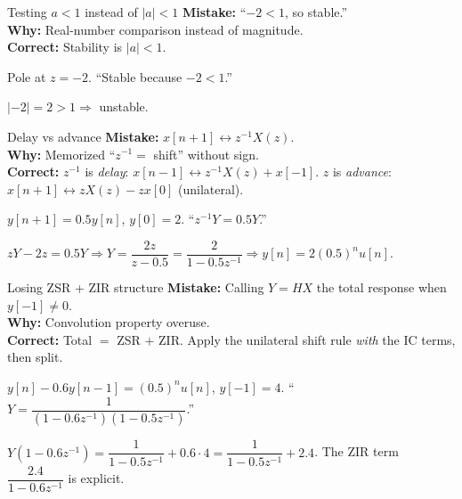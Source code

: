 \documentclass[11pt]{article}
\begin{document}
\begin{pitfallbox}{Testing $a<1$ instead of $|a|<1$}
\textbf{Mistake:} ``$-2 < 1$, so stable.''\\
\textbf{Why:} Real-number comparison instead of magnitude.\\
\textbf{Correct:} Stability is $|a|<1$.
\begin{wrongbox}
Pole at $z=-2$. ``Stable because $-2<1$.''
\end{wrongbox}
\begin{rightbox}
$|-2|=2>1 \Rightarrow$ unstable.
\end{rightbox}
\end{pitfallbox}

\begin{pitfallbox}{Delay vs advance}
\textbf{Mistake:} $x[n+1] \leftrightarrow z^{-1} X(z)$.\\
\textbf{Why:} Memorized ``$z^{-1} = $ shift'' without sign.\\
\textbf{Correct:} $z^{-1}$ is \emph{delay}: $x[n-1] \leftrightarrow z^{-1}X(z) + x[-1]$. $z$ is \emph{advance}: $x[n+1] \leftrightarrow zX(z) - z x[0]$ (unilateral).
\begin{wrongbox}
$y[n+1] = 0.5 y[n]$, $y[0]=2$. ``$z^{-1}Y = 0.5 Y$.''
\end{wrongbox}
\begin{rightbox}
$zY - 2z = 0.5 Y \Rightarrow Y = \dfrac{2z}{z-0.5} = \dfrac{2}{1-0.5z^{-1}} \Rightarrow y[n] = 2(0.5)^n u[n]$.
\end{rightbox}
\end{pitfallbox}

\begin{pitfallbox}{Losing ZSR + ZIR structure}
\textbf{Mistake:} Calling $Y = HX$ the total response when $y[-1]\ne 0$.\\
\textbf{Why:} Convolution property overuse.\\
\textbf{Correct:} Total $=$ ZSR $+$ ZIR. Apply the unilateral shift rule \emph{with} the IC terms, then split.
\begin{wrongbox}
$y[n] - 0.6 y[n-1] = (0.5)^n u[n]$, $y[-1]=4$. ``$Y = \dfrac{1}{(1-0.6z^{-1})(1-0.5z^{-1})}$.''
\end{wrongbox}
\begin{rightbox}
$Y(1-0.6z^{-1}) = \dfrac{1}{1-0.5z^{-1}} + 0.6\cdot 4 = \dfrac{1}{1-0.5z^{-1}} + 2.4$. The ZIR term $\dfrac{2.4}{1-0.6z^{-1}}$ is explicit.
\end{rightbox}
\end{pitfallbox}
\end{document}
